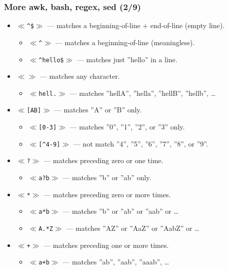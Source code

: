 \documentclass[aspectratio=169, xcolor=table, notheorems, hyperref={pdfpagelabels=false}]{beamer}
\begin{document}
\begin{frame}[fragile]
\frametitle{More awk, bash, regex, sed (2/9)}
\begin{itemize}
\item $\ll$\texttt{\^{}\${}}$\gg$ --- matches a beginning-of-line + end-of-line (empty line).
\begin{itemize}
\item $\ll$\texttt{\^{}}$\gg$ --- matches a beginning-of-line (meaningless).
\item $\ll$\texttt{\^{}hello\${}}$\gg$ --- matches just ''hello'' in a line.
\end{itemize}
\item $\ll${\tiny{}\textbullet}$\gg$ --- matches any character.
\begin{itemize}
\item $\ll$\texttt{hell.}$\gg$ --- matches ''hellA'', ''hella'', ''hellB'', ''hellb'', \ldots
\end{itemize}
\item $\ll$\texttt{[AB]}$\gg$ --- matches ''A'' or ''B'' only.
\begin{itemize}
\item $\ll$\texttt{[0-3]}$\gg$ --- matches ''0'', ''1'', ''2'', or ''3'' only.
\item $\ll$\texttt{[\^{}4-9]}$\gg$ --- not match ''4'', ''5'', ''6'', ''7'', ''8'', or ''9''.
\end{itemize}
\item $\ll$\texttt{?}$\gg$ --- matches preceding zero or one time.
\begin{itemize}
\item $\ll$\texttt{a?b}$\gg$ --- matches ''b'' or ''ab'' only.
\end{itemize}
\item $\ll$\texttt{*}$\gg$ --- matches preceding zero or more times.
\begin{itemize}
\item $\ll$\texttt{a*b}$\gg$ --- matches ''b'' or ''ab'' or ''aab'' or \ldots
\item $\ll$\texttt{A.*Z}$\gg$ --- matches ''AZ'' or ''AaZ'' or ''AabZ'' or \ldots
\end{itemize}
\item $\ll$\texttt{+}$\gg$ --- matches preceding one or more times.
\begin{itemize}
\item $\ll$\texttt{a+b}$\gg$ --- matches ''ab'', ''aab'', ''aaab'', \ldots
\end{itemize}
\end{itemize}
\end{frame}
\end{document}
